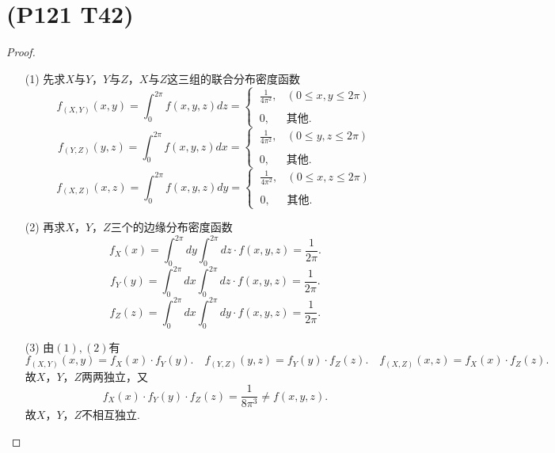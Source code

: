 \documentclass{article}
\begin{document}
\section{(P121 T42)}  %
\begin{proof}
    \begin{enumerate}
        \item []
        \item [(1)]先求$X$与$Y$，$Y$与$Z$，$X$与$Z$这三组的联合分布密度函数
        \[
            f_{(X,Y)} (x,y) 
            = \int_{0}^{2\pi} f(x,y,z) dz   
            =
            \begin{cases}
               \ \frac{1}{4\pi ^2}, & (0\leq x,y \leq 2\pi)\\
               \\
               \ 0, & \mbox{其他}.
            \end{cases}
        \]
        \[
            f_{(Y,Z)} (y,z) 
            = \int_{0}^{2\pi} f(x,y,z) dx   
            =
            \begin{cases}
               \ \frac{1}{4\pi ^2}, & (0\leq y,z \leq 2\pi)\\
               \\
               \ 0, & \mbox{其他}.
            \end{cases}
        \]
        \[
            f_{(X,Z)} (x,z) 
            = \int_{0}^{2\pi} f(x,y,z) dy   
            =
            \begin{cases}
               \ \frac{1}{4\pi ^2}, & (0\leq x,z \leq 2\pi)\\
               \\
               \ 0, & \mbox{其他}.
            \end{cases}
        \]
        \item [(2)]再求$X$，$Y$，$Z$三个的边缘分布密度函数
        \[
            f_{X}(x)
            = \int_{0}^{2\pi} dy \int_{0}^{2\pi} dz \cdot f(x,y,z)  
            = \frac{1}{2\pi}.
        \]
        \[
            f_{Y}(y)
            = \int_{0}^{2\pi} dx \int_{0}^{2\pi} dz \cdot f(x,y,z)  
            = \frac{1}{2\pi}.
        \]
        \[
            f_{Z}(z)
            = \int_{0}^{2\pi} dx \int_{0}^{2\pi} dy \cdot f(x,y,z)  
            = \frac{1}{2\pi}.
        \]
        \item [(3)]由$(1),(2)$有
        \[
            f_{(X,Y)} (x,y) 
            =
            f_{X}(x) \cdot f_{Y}(y).
            \quad
            f_{(Y,Z)} (y,z) 
            =
            f_{Y}(y) \cdot f_{Z}(z).
            \quad
            f_{(X,Z)} (x,z) 
            =
            f_{X}(x) \cdot f_{Z}(z).
        \]
        故$X$，$Y$，$Z$两两独立，又
        \[
            f_{X}(x) \cdot f_{Y}(y) \cdot f_{Z}(z)
            =
            \frac{1}{8 \pi^3}
            \neq f(x,y,z).
        \]
        故$X$，$Y$，$Z$不相互独立.
    \end{enumerate}
\end{proof}
\end{document}
